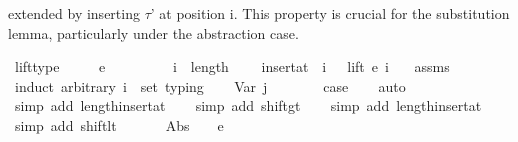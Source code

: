 \begin{isabellebody}
\begin{isamarkuptext}
  extended by inserting $\tau$' at position i.
  This property is crucial for the substitution lemma,
  particularly under the abstraction case.%
\end{isamarkuptext}\isamarkuptrue%
\isamarkupfalse%
\ lift{\isacharunderscore}{\kern0pt}type{\isacharcolon}{\kern0pt}\isanewline
\ \ \ {\isachardoublequoteopen}{\isasymGamma}\ {\isasymturnstile}\ e\ {\isacharcolon}{\kern0pt}\ {\isasymtau}{\isachardoublequoteclose}\isanewline
\ \ \ \ \ \ \ {\isachardoublequoteopen}i\ {\isasymle}\ length\ {\isasymGamma}{\isachardoublequoteclose}\isanewline
\ \ \ {\isachardoublequoteopen}insert{\isacharunderscore}{\kern0pt}at\ {\isasymGamma}\ i\ {\isasymtau}{\isacharprime}{\kern0pt}\ {\isasymturnstile}\ lift\ e\ i\ {\isacharcolon}{\kern0pt}\ {\isasymtau}{\isachardoublequoteclose}\isanewline
%
\isadelimproof
%
\endisadelimproof
%
\isatagproof
{}\isamarkupfalse%
\ assms\isanewline
{}\isamarkupfalse%
\ {\isacharparenleft}{\kern0pt}induct\ arbitrary{\isacharcolon}{\kern0pt}\ i\ {\isasymtau}{\isacharprime}{\kern0pt}\ set{\isacharcolon}{\kern0pt}\ typing{\isacharparenright}{\kern0pt}\isanewline
\ \ \isamarkupfalse%
\ {\isacharparenleft}{\kern0pt}Var\ j\ {\isasymGamma}\ {\isasymtau}{\isacharparenright}{\kern0pt}\isanewline
\ \ \isamarkupfalse%
\ \isamarkupfalse%
\ {\isacharquery}{\kern0pt}case\isanewline
\ \ \isamarkupfalse%
\ auto\isanewline
\ \ \isamarkupfalse%
\ {\isacharparenleft}{\kern0pt}simp\ add{\isacharcolon}{\kern0pt}\ length{\isacharunderscore}{\kern0pt}insert{\isacharunderscore}{\kern0pt}at{\isacharparenright}{\kern0pt}\isanewline
\ \ \isamarkupfalse%
\ {\isacharparenleft}{\kern0pt}simp\ add{\isacharcolon}{\kern0pt}\ shift{\isacharunderscore}{\kern0pt}gt{\isacharparenright}{\kern0pt}\isanewline
\ \ \isamarkupfalse%
\ {\isacharparenleft}{\kern0pt}simp\ add{\isacharcolon}{\kern0pt}\ length{\isacharunderscore}{\kern0pt}insert{\isacharunderscore}{\kern0pt}at{\isacharparenright}{\kern0pt}\isanewline
\ \ \isamarkupfalse%
\ {\isacharparenleft}{\kern0pt}simp\ add{\isacharcolon}{\kern0pt}\ shift{\isacharunderscore}{\kern0pt}lt{\isacharparenright}{\kern0pt}\isanewline
\ \ \isamarkupfalse%
\isanewline
{}\isamarkupfalse%
\isanewline
\ \ \isamarkupfalse%
\ {\isacharparenleft}{\kern0pt}Abs\ {\isasymtau}{}{\isacharprime}{\kern0pt}\ {\isasymtau}\ {\isasymGamma}\ e\ {\isasymtau}{}{\isacharparenright}{\kern0pt}\isanewline

\end{isabellebody}

